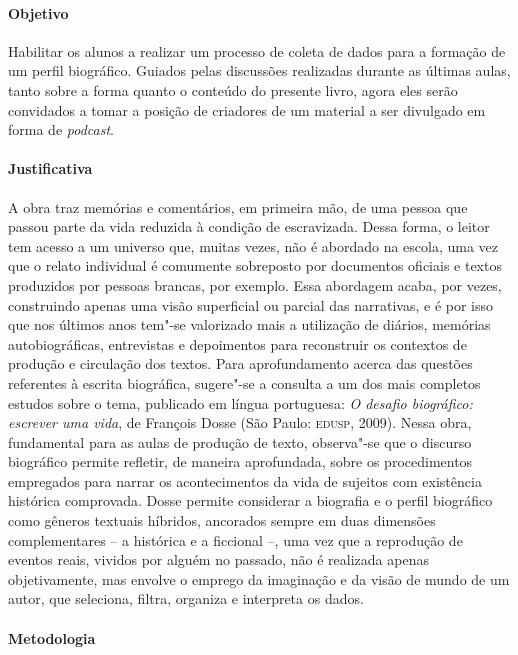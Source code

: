 \documentclass[11pt]{extarticle}
\begin{document}
 \paragraph{Objetivo} Habilitar os alunos a realizar um processo de coleta de dados
 para a formação de um perfil biográfico. Guiados pelas discussões realizadas durante as 
 últimas aulas, tanto sobre a forma quanto o conteúdo do presente livro, agora 
 eles serão convidados a tomar a posição de criadores de um material a ser divulgado
 em forma de \emph{podcast}.

 \paragraph{Justificativa} A obra traz memórias e comentários, em primeira mão, de uma
pessoa que passou parte da vida reduzida à condição de escravizada.
Dessa forma, o leitor tem acesso a um universo que, muitas vezes, não é
abordado na escola, uma vez que o relato individual é comumente
sobreposto por documentos oficiais e textos produzidos por pessoas
brancas, por exemplo. Essa abordagem acaba, por vezes, construindo
apenas uma visão superficial ou parcial das narrativas, e é por isso que
nos últimos anos tem"-se valorizado mais a utilização de diários,
memórias autobiográficas, entrevistas e depoimentos para reconstruir os
contextos de produção e circulação dos textos. 
Para aprofundamento acerca das questões
  referentes à escrita biográfica, sugere"-se a consulta a um dos mais
  completos estudos sobre o tema, publicado em língua portuguesa:
  \emph{O desafio biográfico: escrever uma vida}, de François Dosse (São
  Paulo: \textsc{edusp}, 2009). Nessa obra, fundamental para as aulas de produção
  de texto, observa"-se que o discurso biográfico permite refletir, de
  maneira aprofundada, sobre os procedimentos empregados para narrar os
  acontecimentos da vida de sujeitos com existência histórica
  comprovada. Dosse permite considerar a biografia e o perfil biográfico
  como gêneros textuais híbridos, ancorados sempre em duas dimensões
  complementares -- a histórica e a ficcional --, uma vez que a
  reprodução de eventos reais, vividos por alguém no passado, não é
  realizada apenas objetivamente, mas envolve o emprego da imaginação e
  da visão de mundo de um autor, que seleciona, filtra, organiza e
  interpreta os dados.

 \paragraph{Metodologia}
    
\end{document}
